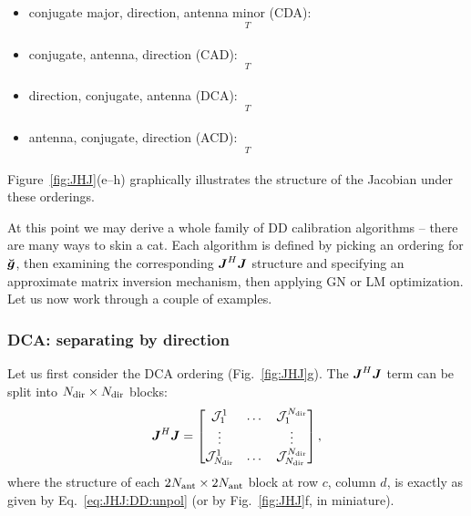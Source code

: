 \documentclass[useAMS,usenatbib]{mn2e}
\makeatletter
\newcommand{\mat}[1]{{\bmath{#1}}}
\newcommand{\JJ}{\mat{J}} %
\newcommand{\JHJ}{\JJ^H\JJ} %
\newcommand{\Matrix}[2]{\left [ \begin{array}{@{}#1@{}}#2\end{array} \right ]}
\newcommand{\AUG}[1]{\bmath{\breve{#1}}}
\newcommand{\Gg}{\AUG{g}}
\numberwithin{equation}{section} %
\makeatother
\begin{document}
\begin{itemize}
\item conjugate major, direction, antenna minor (CDA):
\begin{equation}
[g^{(1)}_1 \dots g^{(1)}_{\Na}, g^{(2)}_1 \dots g^{(2)}_{\Na}, g^{(3)}_1 \dots g^{(\Nd)}_{\Na}, 
 \bar{g}^{(1)}_1 \dots \bar{g}^{(1)}_{\Na} \dots ]^T
\end{equation}
\item conjugate, antenna, direction (CAD):
\begin{equation}
[g^{(1)}_1 \dots g^{(\Nd)}_1, g^{(1)}_2 \dots g^{(\Nd)}_2, g^{(1)}_3 \dots g^{(\Nd)}_{\Na}, 
 \bar{g}^{(1)}_1 \dots ]^T
\end{equation}
\item direction, conjugate, antenna (DCA):
\begin{equation}
[g^{(1)}_1 \dots g^{(1)}_{\Na},\bar{g}^{(1)}_1 \dots \bar{g}^{(1)}_{\Na},
g^{(2)}_1 \dots g^{(2)}_{\Na}, \bar{g}^{(2)}_1 \dots ]^T
\end{equation}
\item antenna, conjugate, direction (ACD):
\begin{equation}
[g^{(1)}_1 \dots g^{(\Nd)}_1,\bar{g}^{(1)}_1 \dots \bar{g}^{(\Nd)}_1,
g^{(1)}_2 \dots g^{(\Nd)}_2, \bar{g}^{(1)}_2 \dots ]^T
\end{equation}
\end{itemize}

Figure~\ref{fig:JHJ}(e--h) graphically illustrates the structure of the Jacobian under these orderings.

At this point we may derive a whole family of DD calibration algorithms -- there are many ways to skin a cat. Each 
algorithm is defined by picking an ordering for $\Gg$, then examining the corresponding $\JHJ$ structure 
and specifying an approximate matrix inversion mechanism, then applying GN or LM optimization. Let us now work 
through a couple of examples.

\subsubsection{DCA: separating by direction}
\label{sec:dca}

\newcommand{\JJJ}{\mathcal{J}}

Let us first consider the DCA ordering (Fig.~\ref{fig:JHJ}g). The $\JHJ$ term can be split into $N_\mathrm{dir}\times N_\mathrm{dir}$ blocks:
\begin{equation}
\label{eq:JHJ:DD:blocked}
\JHJ = \Matrix{ccc}{\JJJ^1_1 & \dots & \JJJ^{\Nd}_1 \\
\vdots & & \vdots \\
\JJJ_{\Nd}^1 & \dots & \JJJ_{\Nd}^{\Nd} },
\end{equation}
where the structure of each $2N_\mathrm{ant}\times2N_\mathrm{ant}$ block at row $c$, column $d$, is exactly as 
given by Eq.~\ref{eq:JHJ:DD:unpol} (or by Fig.~\ref{fig:JHJ}f, in miniature). 
\end{document}
